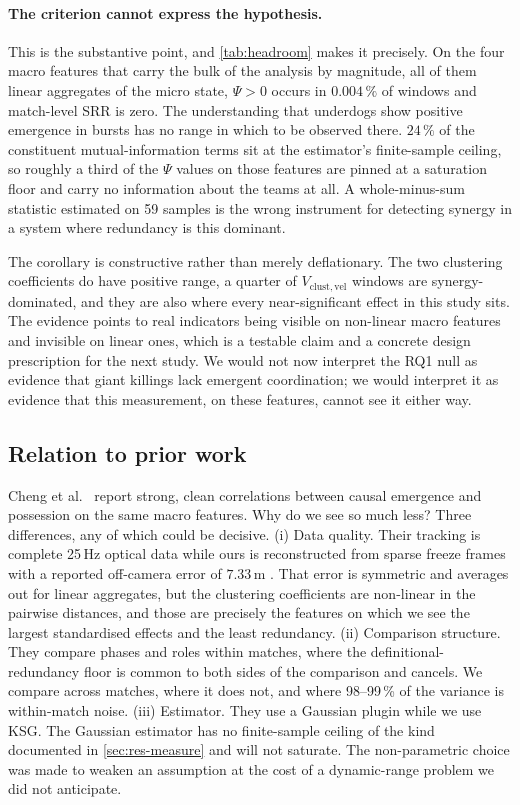 \documentclass[11pt,a4paper]{article}
\newcommand{\Vcv}{V_{\mathrm{clust,vel}}}
\begin{document}
\paragraph{The criterion cannot express the hypothesis.} This is the substantive point,
and \cref{tab:headroom} makes it precisely. On the four macro features that carry the bulk
of the analysis by magnitude, all of them linear aggregates of the micro state, $\Psi>0$ occurs in $0.004\,\%$ of windows and match-level SRR is zero. 
The understanding that underdogs show
positive emergence in bursts has no range in which to be observed there. $24\,\%$
of the constituent mutual-information terms sit at the estimator's finite-sample ceiling,
so roughly a third of the $\Psi$ values on those features are pinned at a saturation
floor and carry no information about the teams at all. A whole-minus-sum statistic
estimated on 59 samples is the wrong instrument for detecting synergy in a system where
redundancy is this dominant.

The corollary is constructive rather than merely deflationary. The two clustering
coefficients do have positive range, a quarter of $\Vcv$ windows are
synergy-dominated, and they are also where every near-significant effect in this study
sits. The evidence points to real indicators being visible on non-linear
macro features and invisible on linear ones, which is a testable claim and a concrete
design prescription for the next study. We would not now interpret the RQ1 null as
evidence that giant killings lack emergent coordination; we would interpret it as evidence
that this measurement, on these features, cannot see it either way.

\subsection{Relation to prior work}

Cheng et al.\ \cite{cheng2025} report strong, clean correlations between causal emergence
and possession on the same macro features. Why do we see so much less? Three differences,
any of which could be decisive. (i) Data quality. Their tracking is complete 25\,Hz
optical data while ours is reconstructed from sparse freeze frames with a reported off-camera
error of $7.33$\,m \cite{penn2023}. That error is symmetric and averages out for linear
aggregates, but the clustering coefficients are non-linear in the pairwise distances, and
those are precisely the features on which we see the largest standardised effects and the
least redundancy. (ii) Comparison structure. They compare phases and roles
within matches, where the definitional-redundancy floor is common to both sides of
the comparison and cancels. We compare across matches, where it does not, and where
98--99\,\% of the variance is within-match noise. (iii) Estimator. They use a
Gaussian plugin while we use KSG. The Gaussian estimator has no finite-sample ceiling of the
kind documented in \cref{sec:res-measure} and will not saturate. The non-parametric choice
was made to weaken an assumption at the cost of a dynamic-range problem we
did not anticipate.
\end{document}
